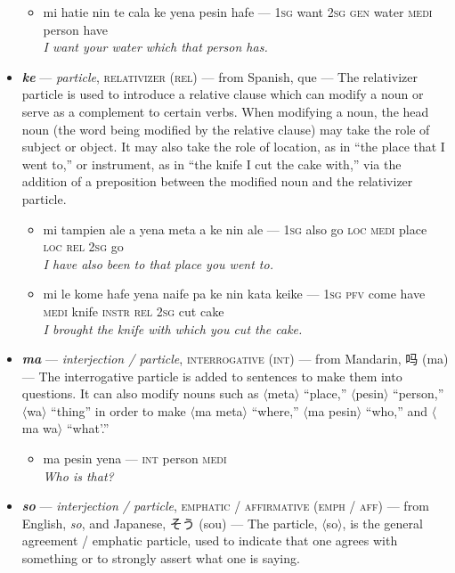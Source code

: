 \documentclass[a4paper, titlepage]{article}
\begin{document}
\begin{itemize}
	\begin{itemize}
		\item mi hatie nin te cala ke yena pesin hafe — \textsc{1sg} want \textsc{2sg gen} water \textsc{medi} person have \\\textit{I want your water which that person has.}
	\end{itemize}
	\item \textbf{\textit{ke}} —  \textit{particle}, \textsc{relativizer (rel)} — from Spanish, que — The relativizer particle is used to introduce a relative clause which can modify a noun or serve as a complement to certain verbs. When modifying a noun, the head noun (the word being modified by the relative clause) may take the role of subject or object. It may also take the role of location, as in ``the place that I went to,'' or instrument, as in ``the knife I cut the cake with,'' via the addition of a preposition between the modified noun and the relativizer particle.
	\begin{itemize}
		\item mi tampien ale a yena meta a ke nin ale — \textsc{1sg} also go \textsc{loc medi} place \textsc{loc rel 2sg} go \\\textit{I have also been to that place you went to.}
		\item mi le kome hafe yena naife pa ke nin kata keike — \textsc{1sg pfv} come have \textsc{medi} knife \textsc{instr rel 2sg} cut cake \\\textit{I brought the knife with which you cut the cake.}
	\end{itemize}
	\item \textbf{\textit{ma}} —  \textit{interjection / particle}, \textsc{interrogative (int)} — from Mandarin, 吗 (ma) — The interrogative particle is added to sentences to make them into questions. It can also modify nouns such as $\langle$meta$\rangle$ ``place,'' $\langle$pesin$\rangle$ ``person,'' $\langle$wa$\rangle$ ``thing'' in order to make $\langle$ma meta$\rangle$ ``where,'' $\langle$ma pesin$\rangle$ ``who,'' and $\langle$ma wa$\rangle$ ``what'.''
	\begin{itemize}
		\item ma pesin yena — \textsc{int} person \textsc{medi} \\\textit{Who is that?}
	\end{itemize}
	\item \textbf{\textit{so}} — \textit{interjection / particle}, \textsc{emphatic / affirmative (emph / aff)} — from English, \textit{so}, and Japanese, そう (sou) — The particle, $\langle$so$\rangle$, is the general agreement / emphatic particle, used to indicate that one agrees with something or to strongly assert what one is saying.

\end{itemize}
\end{document}
